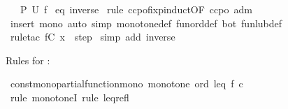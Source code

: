 \begin{isabellebody}
\ \ \ {\isachardoublequoteopen}P\ {\isacharparenleft}{\kern0pt}U\ f{\isacharparenright}{\kern0pt}{\isachardoublequoteclose}\isanewline
%
\isadelimproof
%
\endisadelimproof
%
\isatagproof
{}\isamarkupfalse%
\ eq\ inverse\isanewline
{}\isamarkupfalse%
\ {\isacharparenleft}{\kern0pt}rule\ ccpo{\isachardot}{\kern0pt}fixp{\isacharunderscore}{\kern0pt}induct{\isacharbrackleft}{\kern0pt}OF\ ccpo\ adm{\isacharbrackright}{\kern0pt}{\isacharparenright}{\kern0pt}\isanewline
{}\isamarkupfalse%
\ {\isacharparenleft}{\kern0pt}insert\ mono{\isacharcomma}{\kern0pt}\ auto\ simp{\isacharcolon}{\kern0pt}\ monotone{\isacharunderscore}{\kern0pt}def\ fun{\isacharunderscore}{\kern0pt}ord{\isacharunderscore}{\kern0pt}def\ bot\ fun{\isacharunderscore}{\kern0pt}lub{\isacharunderscore}{\kern0pt}def{\isacharparenright}{\kern0pt}{\isacharbrackleft}{\kern0pt}{}{\isacharbrackright}{\kern0pt}\isanewline
{}\isamarkupfalse%
\ {\isacharparenleft}{\kern0pt}rule{\isacharunderscore}{\kern0pt}tac\ f{}{\isacharequal}{\kern0pt}{\isachardoublequoteopen}C\ x{\isachardoublequoteclose}\ \ step{\isacharparenright}{\kern0pt}\isanewline
{}\isamarkupfalse%
\ {\isacharparenleft}{\kern0pt}simp\ add{\isacharcolon}{\kern0pt}\ inverse{\isacharparenright}{\kern0pt}\isanewline
{}\isamarkupfalse%
%
\endisatagproof
{\isafoldproof}%
%
\isadelimproof
%
\endisadelimproof
%
\begin{isamarkuptext}%
Rules for :%
\end{isamarkuptext}\isamarkuptrue%
\isamarkupfalse%
\ const{\isacharunderscore}{\kern0pt}mono{\isacharbrackleft}{\kern0pt}partial{\isacharunderscore}{\kern0pt}function{\isacharunderscore}{\kern0pt}mono{\isacharbrackright}{\kern0pt}{\isacharcolon}{\kern0pt}\ {\isachardoublequoteopen}monotone\ ord\ leq\ {\isacharparenleft}{\kern0pt}{\isasymlambda}f{\isachardot}{\kern0pt}\ c{\isacharparenright}{\kern0pt}{\isachardoublequoteclose}\isanewline
%
\isadelimproof
%
\endisadelimproof
%
\isatagproof
{}\isamarkupfalse%
\ {\isacharparenleft}{\kern0pt}rule\ monotoneI{\isacharparenright}{\kern0pt}\ {\isacharparenleft}{\kern0pt}rule\ leq{\isacharunderscore}{\kern0pt}refl{\isacharparenright}{\kern0pt}%
\endisatagproof
{\isafoldproof}%
%
\isadelimproof
\isanewline
%
\endisadelimproof
\isanewline
{}\isamarkupfalse%
%
\isadelimdocument
%
\endisadelimdocument
%
\isatagdocument
%
\end{isabellebody}
